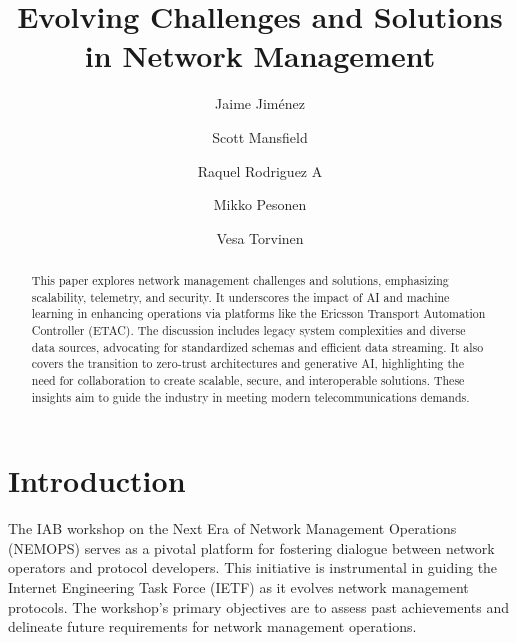 \documentclass[11pt,sigconf]{iabart}
\begin{document}
\title{Evolving Challenges and Solutions in Network Management}

\author{Jaime Jiménez}

\author{Scott Mansfield}

\author{Raquel Rodriguez A}

\author{Mikko Pesonen}

\author{Vesa Torvinen}


\begin{abstract}

This paper explores network management challenges and solutions, emphasizing scalability, telemetry, and security. It underscores the impact of AI and machine learning in enhancing operations via platforms like the Ericsson Transport Automation Controller (ETAC). The discussion includes legacy system complexities and diverse data sources, advocating for standardized schemas and efficient data streaming. It also covers the transition to zero-trust architectures and generative AI, highlighting the need for collaboration to create scalable, secure, and interoperable solutions. These insights aim to guide the industry in meeting modern telecommunications demands.


\end{abstract}


\maketitle

\section{Introduction} \label{introduction}

The IAB workshop on the Next Era of Network Management Operations (NEMOPS) serves as a pivotal platform for fostering dialogue between network operators and protocol developers. This initiative is instrumental in guiding the Internet Engineering Task Force (IETF) as it evolves network management protocols. The workshop's primary objectives are to assess past achievements and delineate future requirements for network management operations.
\end{document}
